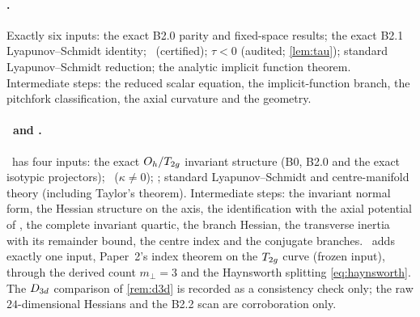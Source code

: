 \paragraph{\propBtwo.} Exactly six inputs: the exact B2.0 parity and fixed-space results; the exact B2.1
Lyapunov--Schmidt identity; \lemQ\ (certified); $\tau<0$ (audited; \cref{lem:tau}); standard Lyapunov--Schmidt
reduction; the analytic implicit function theorem. Intermediate steps: the reduced scalar equation, the
implicit-function branch, the pitchfork classification, the axial curvature and the geometry.

\paragraph{\propBthree\ and \corBthree.} \propBthree\ has four inputs: the exact $O_{h}/T_{2g}$ invariant structure (B0,
B2.0 and the exact isotypic projectors); \lemK\ ($\kappa\ne0$); \propBtwo; standard Lyapunov--Schmidt and centre-manifold
theory (including Taylor's theorem). Intermediate steps: the invariant normal form, the Hessian structure on the axis,
the identification with the axial potential of \propBtwo, the complete invariant quartic, the branch Hessian, the
transverse inertia with its remainder bound, the centre index and the conjugate branches. \corBthree\ adds exactly one
input, Paper~2's index theorem on the $T_{2g}$ curve (frozen input), through the derived count $m_\perp=3$ and the
Haynsworth splitting \eqref{eq:haynsworth}. The $D_{3d}$ comparison of \cref{rem:d3d} is recorded as a consistency
check only; the raw $24$-dimensional Hessians and the B2.2 scan are corroboration only.
